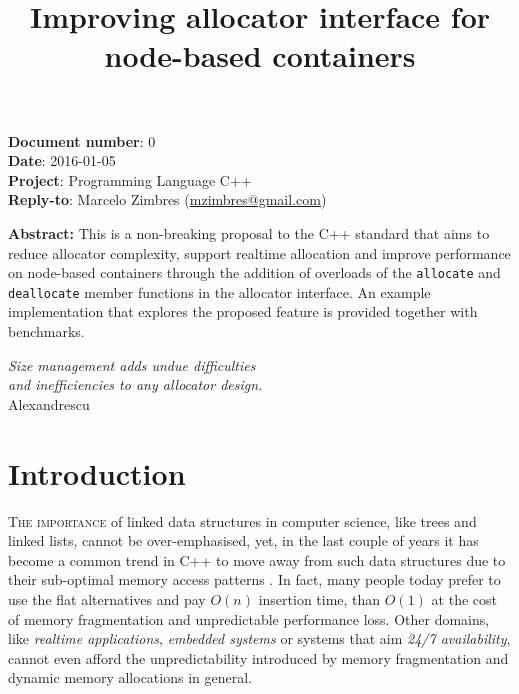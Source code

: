 \documentclass[11pt]{article}
\begin{document}
\date{}
\title{\bf Improving allocator interface for node-based containers}

\vspace{-2cm}
\maketitle


\noindent
{\bf Document number}:  0 \\
{\bf Date}:  2016-01-05 \\
{\bf Project}: Programming Language C++ \\
{\bf Reply-to}: Marcelo Zimbres (\href{mailto:mzimbres@gmail.com}{mzimbres@gmail.com}) 

\vspace{1cm}

\noindent
{\bf Abstract: }This is a non-breaking proposal to the C++ standard
that aims to reduce allocator complexity, support realtime allocation
and improve performance on node-based containers through the addition
of overloads of the \texttt{allocate} and
\texttt{deallocate} member functions in the allocator interface. An
example implementation that explores the proposed feature is provided
together with benchmarks.

\tableofcontents

\vfill
\begin{flushright}
\noindent
{\it Size management adds undue difficulties \\
     and inefficiencies to any allocator design.} \\
Alexandrescu \\
\medskip
{\it }
\end{flushright}
\medskip

\section{Introduction}
\textsc{The importance} of linked data structures in computer science,
like trees and linked lists, cannot be over-emphasised, yet, in the
last couple of years it has become a common trend in C++ to move away
from such data structures due to their sub-optimal memory access
patterns \cite{chandler, meyers}.  In fact, many people today prefer to use the flat
alternatives and pay $O(n)$ insertion time, than $O(1)$ at the cost of
memory fragmentation and unpredictable performance loss. Other
domains, like {\it realtime applications}, {\it embedded systems} or
systems that aim {\it 24/7 availability}, cannot even afford the
unpredictability introduced by memory fragmentation and dynamic
memory allocations in general.
\end{document}

